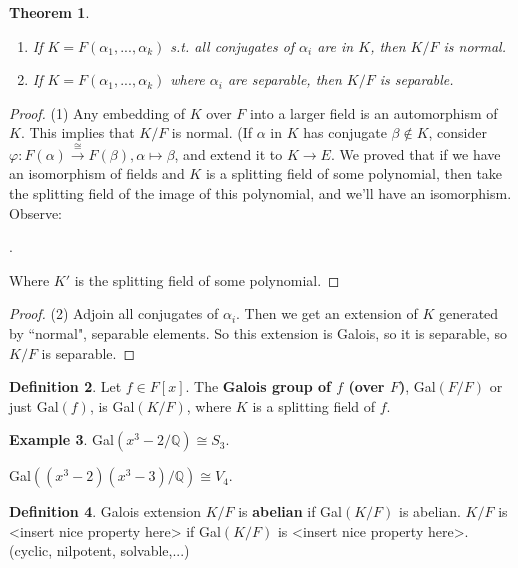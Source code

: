 \documentclass[9pt,reqno,twoside]{amsbook}
\theoremstyle{plain}
\newtheorem{theorem}{Theorem}[chapter]
\numberwithin{section}{chapter}
\numberwithin{equation}{chapter}
\theoremstyle{definition}
\newtheorem{Def}[theorem]{Definition}
\newtheorem{Ex}[theorem]{Example}
\theoremstyle{remark}
\theoremstyle{plain}
\newcommand{\Q}{\mathbb{Q}}
\renewcommand{\phi}{\varphi}
\begin{document}
\begin{theorem}
\begin{enumerate}
\item 
If $K = F(\alpha_1,...,\alpha_k)$ s.t. all conjugates of $\alpha_i$ are in $K$, then $K/F$ is normal. 
\item If $K = F(\alpha_1,...,\alpha_k)$ where $\alpha_i$ are separable, then $K/F$ is separable. 
\end{enumerate}
\end{theorem}
\begin{proof}
(1) Any embedding of $K$ over $F$ into a larger field is an automorphism of $K$. This implies that $K/F$ is normal. (If $\alpha$ in $K$ has conjugate $\beta \notin K$, consider $\phi:F(\alpha) \overset{\cong}{\to} F(\beta), \alpha \mapsto \beta$, and extend it to $K \to E$. We proved that if we have an isomorphism of fields and $K$ is a splitting field of some polynomial, then take the splitting field of the image of this polynomial, and we'll have an isomorphism. Observe:
\begin{center}
.
\end{center}
Where $K'$ is the splitting field of some polynomial. 
\end{proof}

\begin{proof}
(2) Adjoin all conjugates of $\alpha_i$. Then we get an extension of $K$ generated by ``normal", separable elements. So this extension is Galois, so it is separable, so $K/F$ is separable. 
\end{proof}

\begin{Def}
Let $f \in F[x]$. The \textbf{Galois group of $f$ (over $F$)}, Gal$(F/F)$ or just Gal$(f)$, is Gal$(K/F)$, where $K$ is a splitting field of $f$. 
\end{Def}

\begin{Ex}
Gal$(x^3 - 2/\Q) \cong S_3$. 

Gal$((x^3 - 2)(x^3 - 3)/\Q) \cong V_4$. 
\end{Ex}

\begin{Def}
Galois extension $K/F$ is \textbf{abelian} if Gal$(K/F)$ is abelian. $K/F$ is <insert nice property here> if Gal$(K/F)$ is <insert nice property here>. (cyclic, nilpotent, solvable,...)
\end{Def}
\end{document}
